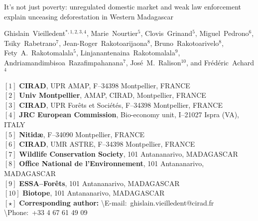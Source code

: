 \begin{center}
  \LARGE{It's not just poverty: unregulated domestic market and weak law enforcement explain unceasing deforestation in Western Madagascar}
\end{center}

\vspace{1cm}

\begin{center}
  \large{Ghislain~Vieilledent$^{*,1,2,3,4}$, Marie~Nourtier$^5$, Clovis~Grinand$^5$, Miguel~Pedrono$^6$,     Tsiky~Rabetrano$^7$, Jean-Roger~Rakotoarijaona$^8$, Bruno~Rakotoarivelo$^8$, Fety~A.~Rakotomalala$^5$, 
  Linjanantenaina~Rakotomalala$^9$, Andriamandimbisoa~Razafimpahanana$^7$, 
  José~M.~Ralison$^{10}$, and Frédéric~Achard$^4$}
\end{center}

\vspace{1cm}

{\small
  \begin{flushleft}
    $[1]$ \textbf{CIRAD}, UPR AMAP, F--34398 Montpellier, FRANCE\\ 
    $[2]$ \textbf{Univ Montpellier}, AMAP, CIRAD, Montpellier, FRANCE\\
    $[3]$ \textbf{CIRAD}, UPR Forêts et Sociétés, F--34398 Montpellier, FRANCE\\
    $[4]$ \textbf{JRC European Commission}, Bio-economy unit, I--21027 Ispra (VA), ITALY\\
    $[5]$ \textbf{Nitid\ae}, F--34090 Montpellier, FRANCE\\
    $[6]$ \textbf{CIRAD}, UMR ASTRE, F--34398 Montpellier, FRANCE\\
    $[7]$ \textbf{Wildlife Conservation Society}, 101 Antananarivo, MADAGASCAR\\
    $[8]$ \textbf{Office National de l'Environnement}, 101 Antananarivo, MADAGASCAR\\
    $[9]$ \textbf{ESSA--Forêts}, 101 Antananarivo, MADAGASCAR\\
    $[10]$ \textbf{Biotope}, 101 Antananarivo, MADAGASCAR
    ~\\
    $[\star]$ \textbf{Corresponding author:}
    \textbackslash{E-mail}:~ghislain.vieilledent@cirad.fr
    \textbackslash{Phone}:~+33 4 67 61 49 09\\
  \end{flushleft}}
\newpage
